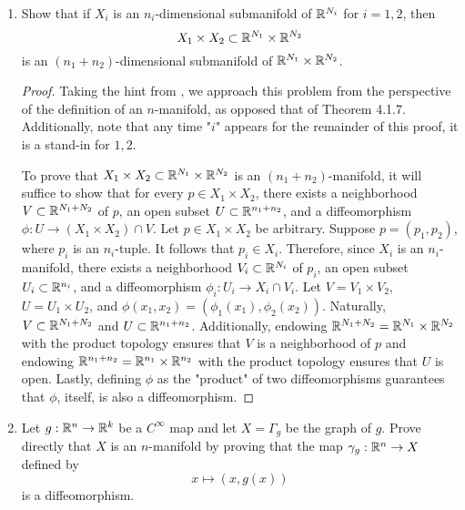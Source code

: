 \documentclass[../psets.tex]{subfiles}
\begin{document}
\begin{enumerate}[label={\textbf{4.1.\roman*.}}]
\begin{proof}
        \begin{equation*}
            \boxed{|a| < \sqrt{n}}
        \end{equation*}
    \end{proof}
    \item Show that if $X_i$ is an $n_i$-dimensional submanifold of $\mathbb{R}^{N_i}$ for $i=1,2$, then
    \begin{equation*}
        X_1\times X_2 \subset \mathbb{R}^{N_1}\times\mathbb{R}^{N_2}
    \end{equation*}
    is an $(n_1+n_2)$-dimensional submanifold of $\mathbb{R}^{N_1}\times\mathbb{R}^{N_2}$.
    \begin{proof}
        Taking the hint from \textcite[98]{bib:DifferentialForms}, we approach this problem from the perspective of the definition of an $n$-manifold, as opposed that of Theorem 4.1.7. Additionally, note that any time "$i$" appears for the remainder of this proof, it is a stand-in for $1,2$.\par
        To prove that $X_1\times X_2\subset\mathbb{R}^{N_1}\times\mathbb{R}^{N_2}$ is an $(n_1+n_2)$-manifold, it will suffice to show that for every $p\in X_1\times X_2$, there exists a neighborhood $V\subset\mathbb{R}^{N_1+N_2}$ of $p$, an open subset $U\subset\mathbb{R}^{n_1+n_2}$, and a diffeomorphism $\phi:U\to(X_1\times X_2)\cap V$. Let $p\in X_1\times X_2$ be arbitrary. Suppose $p=(p_1,p_2)$, where $p_i$ is an $n_i$-tuple. It follows that $p_i\in X_i$. Therefore, since $X_i$ is an $n_i$-manifold, there exists a neighborhood $V_i\subset\mathbb{R}^{N_i}$ of $p_i$, an open subset $U_i\subset\mathbb{R}^{n_i}$, and a diffeomorphism $\phi_i:U_i\to X_i\cap V_i$. Let $V=V_1\times V_2$, $U=U_1\times U_2$, and $\phi(x_1,x_2)=(\phi_1(x_1),\phi_2(x_2))$. Naturally, $V\subset\mathbb{R}^{N_1+N_2}$ and $U\subset\mathbb{R}^{n_1+n_2}$. Additionally, endowing $\mathbb{R}^{N_1+N_2}=\mathbb{R}^{N_1}\times\mathbb{R}^{N_2}$ with the product topology ensures that $V$ is a neighborhood of $p$ and endowing $\mathbb{R}^{n_1+n_2}=\mathbb{R}^{n_1}\times\mathbb{R}^{n_2}$ with the product topology ensures that $U$ is open. Lastly, defining $\phi$ as the "product" of two diffeomorphisms guarantees that $\phi$, itself, is also a diffeomorphism.
    \end{proof}
    \item Let $g:\mathbb{R}^n\to\mathbb{R}^k$ be a $C^\infty$ map and let $X=\Gamma_g$ be the graph of $g$. Prove directly that $X$ is an $n$-manifold by proving that the map $\gamma_g:\mathbb{R}^n\to X$ defined by
    \begin{equation*}
        x \mapsto (x,g(x))
    \end{equation*}
    is a diffeomorphism.

\end{enumerate}
\end{document}
